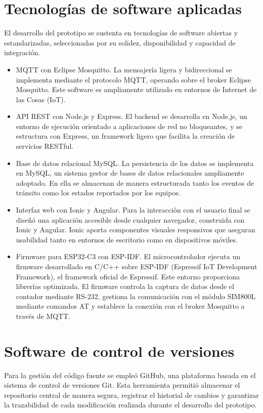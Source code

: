 \section{Tecnologías de software aplicadas}
El desarrollo del prototipo se sustenta en tecnologías de software abiertas y estandarizadas, seleccionadas por su solidez, disponibilidad y capacidad de integración.

\begin{itemize}

\item MQTT con Eclipse Mosquitto. 
La mensajería ligera y bidireccional se implementa mediante el protocolo MQTT, operando sobre el broker Eclipse Mosquitto. Este software es ampliamente utilizado en entornos de Internet de las Cosas (IoT).

\item API REST con Node.js y Express. 
El backend se desarrolla en Node.js, un entorno de ejecución orientado a aplicaciones de red no bloqueantes, y se estructura con Express, un framework ligero que facilita la creación de servicios RESTful.

\item Base de datos relacional MySQL. 
La persistencia de los datos se implementa en MySQL, un sistema gestor de bases de datos relacionales ampliamente adoptado. En ella se almacenan de manera estructurada tanto los eventos de tránsito como los estados reportados por los equipos.

\item Interfaz web con Ionic y Angular.
Para la interacción con el usuario final se diseñó una aplicación accesible desde cualquier navegador, construida con Ionic y Angular. Ionic aporta componentes visuales responsivos que aseguran usabilidad tanto en entornos de escritorio como en dispositivos móviles.


\item  Firmware para ESP32-C3 con ESP-IDF.
El microcontrolador ejecuta un firmware desarrollado en C/C++ sobre ESP-IDF (Espressif IoT Development Framework), el framework oficial de Espressif. Este entorno proporciona librerías optimizada. El firmware controla la captura de datos desde el contador mediante RS-232, gestiona la comunicación con el módulo SIM800L mediante comandos AT y establece la conexión con el broker Mosquitto a través de MQTT.

\end{itemize}


\section{Software de control de versiones}
Para la gestión del código fuente se empleó GitHub, una plataforma basada en el sistema de control de versiones Git. Esta herramienta permitió almacenar el repositorio central de manera segura, registrar el historial de cambios y garantizar la trazabilidad de cada modificación realizada durante el desarrollo del prototipo.

